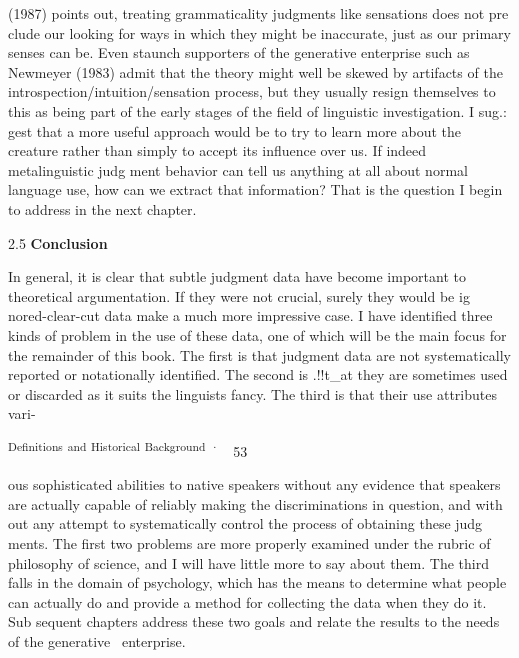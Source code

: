 \begin{styleStandard}
(1987) points out, treating grammaticality judgments like sensations does not pre\- clude our looking for ways in which they might be inaccurate, just as our primary senses can be. Even staunch supporters of the generative enterprise such as Newmeyer (1983) admit that the theory might well be skewed by artifacts of the introspection/intuition/sensation process, but they usually resign themselves to this as being part of the early stages of the field of linguistic investigation. I sug.: gest that a more useful approach would be to try to learn more about the creature rather than simply to accept its influence over us. If indeed metalinguistic judg\- ment behavior can tell us anything at all about normal language use, how can we extract that information? That is the question I begin to address in the next chapter.
\end{styleStandard}


\begin{styleStandard}
2.5 \textbf{Conclusion}
\end{styleStandard}


\begin{styleStandard}
In general, it is clear that subtle judgment data have become important to theoretical argumentation. If they were not crucial, surely they would be ig\- nored-clear-cut data make a much more impressive case. I have identified three kinds of problem in the use of these data, one of which will be the main focus for the remainder of this book. The first is that judgment data are not systematically reported or notationally identified. The second is .!!t\_at they are sometimes used or discarded as it suits the linguist{\textquotesingle}s fancy. The third is that their use attributes vari-
\end{styleStandard}


\clearpage\setcounter{page}{1}\begin{styleStandard}
\textsuperscript{Definitions}\textsuperscript{ }\textsuperscript{and}\textsuperscript{ }\textsuperscript{Historical}\textsuperscript{ }\textsuperscript{Background}\textsuperscript{ }\textsuperscript{·}\ \ 53
\end{styleStandard}


\begin{styleTextbody}
ous sophisticated abilities to native speakers without any evidence that speakers are actually capable of reliably making the discriminations in question, and with\- out any attempt to systematically control the process of obtaining these judg\- ments. The first two problems are more properly examined under the rubric of philosophy of science, and I will have little more to say about them. The third falls in the domain of psychology, which has the means to determine what people can actually do and provide a method for collecting the data when they do it. Sub\- sequent chapters address these two goals and relate the results to the needs of the generative \ enterprise.
\end{styleTextbody}


